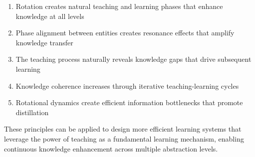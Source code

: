 \begin{enumerate}
    \item Rotation creates natural teaching and learning phases that enhance knowledge at all levels
    \item Phase alignment between entities creates resonance effects that amplify knowledge transfer
    \item The teaching process naturally reveals knowledge gaps that drive subsequent learning
    \item Knowledge coherence increases through iterative teaching-learning cycles
    \item Rotational dynamics create efficient information bottlenecks that promote distillation
\end{enumerate}

These principles can be applied to design more efficient learning systems that leverage the power of teaching as a fundamental learning mechanism, enabling continuous knowledge enhancement across multiple abstraction levels.